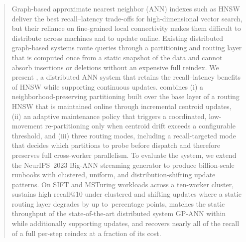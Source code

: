 \documentclass[sigconf,review,anonymous]{acmart}
\begin{document}
\begin{abstract}
Graph-based approximate nearest neighbor (ANN) indexes such as HNSW
deliver the best recall--latency trade-offs for high-dimensional vector
search, but their reliance on fine-grained local connectivity makes them
difficult to distribute across machines and to update online. Existing
distributed graph-based systems route queries through a partitioning and
routing layer that is computed once from a static snapshot of the data and
cannot absorb insertions or deletions without an expensive full reindex.
We present \SystemName{}, a distributed ANN system that retains the
recall--latency benefits of HNSW while supporting continuous updates. \SystemName{}
combines (i) a neighborhood-preserving partitioning built over the base
layer of a routing HNSW that is maintained online through incremental
centroid updates, (ii) an adaptive maintenance policy that triggers a
coordinated, low-movement re-partitioning only when centroid drift exceeds
a configurable threshold, and (iii) three routing modes, including a
recall-targeted mode that decides which partitions to probe before
dispatch and therefore preserves full cross-worker parallelism. To
evaluate the system, we extend the NeurIPS~2023 Big-ANN streaming
generator to produce billion-scale runbooks with clustered, uniform, and
distribution-shifting update patterns. On SIFT and MSTuring workloads
across a ten-worker cluster, \SystemName{} sustains high recall@10 under
clustered and shifting updates where a static routing layer degrades by
up to \,percentage points, matches the static
throughput of the state-of-the-art distributed system GP-ANN within
 while additionally
supporting updates, and recovers nearly all of the recall of a full
per-step reindex at a fraction of its cost.
\end{abstract}

\end{document}
